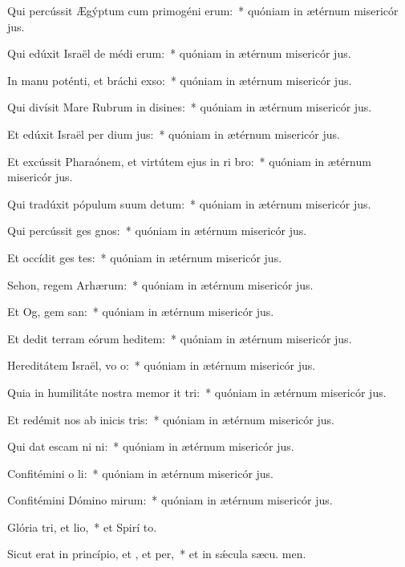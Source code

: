 \item Qui percússit Ægýptum cum primogéni erum:~* quóniam in ætérnum misericór jus.
\item Qui edúxit Israël de médi erum:~* quóniam in ætérnum misericór jus.
\item In manu poténti, et bráchi exso:~* quóniam in ætérnum misericór jus.
\item Qui divísit Mare Rubrum in disines:~* quóniam in ætérnum misericór jus.
\item Et edúxit Israël per dium jus:~* quóniam in ætérnum misericór jus.
\item Et excússit Pharaónem, et virtútem ejus in ri bro:~* quóniam in ætérnum misericór jus.
\item Qui tradúxit pópulum suum  detum:~* quóniam in ætérnum misericór jus.
\item Qui percússit ges gnos:~* quóniam in ætérnum misericór jus.
\item Et occídit ges tes:~* quóniam in ætérnum misericór jus.
\item Sehon, regem Arhærum:~* quóniam in ætérnum misericór jus.
\item Et Og, gem san:~* quóniam in ætérnum misericór jus.
\item Et dedit terram eórum heditem:~* quóniam in ætérnum misericór jus.
\item Hereditátem Israël, vo o:~* quóniam in ætérnum misericór jus.
\item Quia in humilitáte nostra memor it tri:~* quóniam in ætérnum misericór jus.
\item Et redémit nos ab inicis tris:~* quóniam in ætérnum misericór jus.
\item Qui dat escam ni ni:~* quóniam in ætérnum misericór jus.
\item Confitémini o li:~* quóniam in ætérnum misericór jus.
\item Confitémini Dómino mirum:~* quóniam in ætérnum misericór jus.
\item Glória tri, et lio,~* et Spirí to.
\item Sicut erat in princípio, et , et per,~* et in sǽcula sæcu. men.
